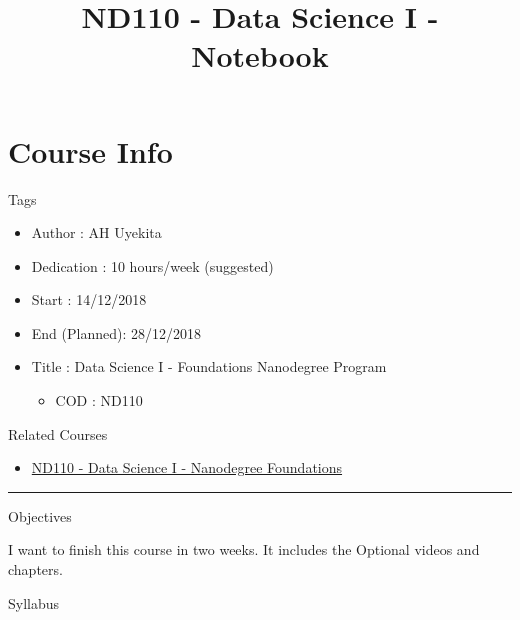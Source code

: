\documentclass[]{book}
\title{ND110 - Data Science I - Notebook}
\author{}
\date{}
\providecommand{\tightlist}{%
  \setlength{\itemsep}{0pt}\setlength{\parskip}{0pt}}
\begin{document}
\maketitle

{
\setcounter{tocdepth}{1}
\tableofcontents
}
\chapter*{Course Info}\label{course-info}

Tags

\begin{itemize}
\tightlist
\item
  Author : AH Uyekita
\item
  Dedication : 10 hours/week (suggested)
\item
  Start : 14/12/2018
\item
  End (Planned): 28/12/2018
\item
  Title : Data Science I - Foundations Nanodegree Program

  \begin{itemize}
  \tightlist
  \item
    COD : ND110
  \end{itemize}
\end{itemize}

Related Courses

\begin{itemize}
\tightlist
\item
  \href{https://br.udacity.com/course/python-fundamentos-data-science--nd110}{ND110
  - Data Science I - Nanodegree Foundations}
\end{itemize}

\begin{center}\rule{0.5\linewidth}{\linethickness}\end{center}

Objectives

I want to finish this course in two weeks. It includes the Optional
videos and chapters.

Syllabus
\end{document}
